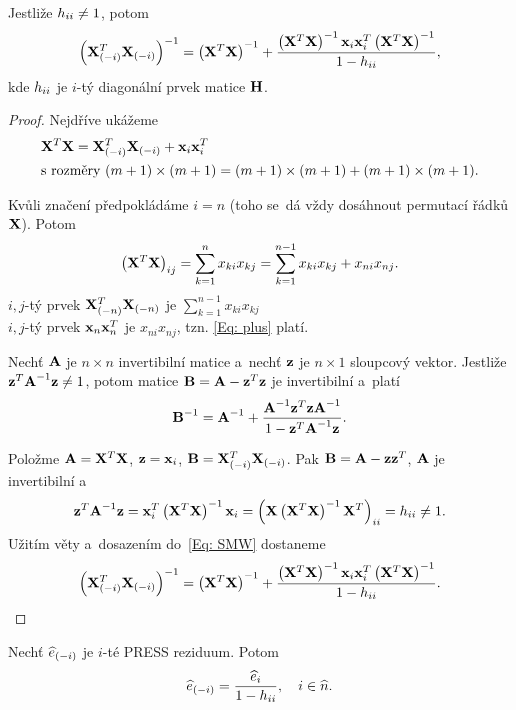 \begin{theorem}
\label{Th: Rozklad_xtx}
Jestliže $h_{ii} \neq 1$, potom
 $$
\left(\mathbf{X}_{(-i)}^T \mathbf{X}_{(-i)} \right)^{-1} = \left(\mathbf{X}^T \mathbf{X} \right)^{-1} + \frac{\left(\mathbf{X}^T \mathbf{X} \right)^{-1} \mathbf{x}_i \mathbf{x}_i^T \left(\mathbf{X}^T \mathbf{X} \right)^{-1}}{1 - h_{ii}},
 $$
kde $h_{ii}$ je $i$-tý diagonální prvek matice $\textbf{H}$.
\end{theorem}

\begin{proof}
Nejdříve ukážeme
\begin{align}
	& \mathbf{X}^T \mathbf{X} = \mathbf{X}_{(-i)}^T \mathbf{X}_{(-i)} + \mathbf{x}_i \mathbf{x}_i^T \label{Eq: plus} \\
	& \text{s rozměry } (m+1) \times (m+1) = (m+1) \times (m+1) + (m+1) \times (m+1). \notag
\end{align}

\newcommand{\sumkn}{\sum_{k = 1}^n}
\newcommand{\sumknn}{\sum_{k = 1}^{n-1}}

Kvůli značení předpokládáme $i = n$ (toho se~dá vždy dosáhnout permutací řádků $\mathbf{X}$). Potom
 $$
\left(\X^T \X \right)_{ij} = \sumkn x_{ki} x_{kj} = \sumknn x_{ki} x_{kj} + x_{ni} x_{nj}.
 $$
 $i,j$-tý prvek $\mathbf{X}_{(-n)}^T \mathbf{X}_{(-n)}$ je $\sumknn x_{ki} x_{kj}$ \\
 $i,j$-tý prvek $\mathbf{x}_n \mathbf{x}_n^T$ je $x_{ni} x_{nj}$, tzn. \eqref{Eq: plus} platí.

\begin{theorem}
Nechť $\textbf{A}$ je $n \times n$ invertibilní matice a~nechť $\mathbf{z}$ je $n \times 1$ sloupcový vektor. Jestliže $\mathbf{z}^T {\textbf{A}^{-1}} \mathbf{z} \neq 1$, potom matice $\textbf{B} = \textbf{A} - \mathbf{z}^T \mathbf{z}$ je invertibilní a~platí
 \begin{equation}
{\textbf{B}^{-1}} = {\textbf{A}^{-1}} + \frac{{\textbf{A}^{-1}} \mathbf{z}^T \mathbf{z} {\textbf{A}^{-1}}}{1 - \mathbf{z}^T {\textbf{A}^{-1}} \mathbf{z}}.
\label{Eq: SMW}
\end{equation}
\end{theorem}

Položme $\textbf{A} = \mathbf{X}^T \mathbf{X}$, $\mathbf{z} = \mathbf{x}_i$, $\textbf{B} = \mathbf{X}_{(-i)}^T \mathbf{X}_{(-i)}$. Pak $\textbf{B} = \textbf{A} - \mathbf{z} \mathbf{z}^T$, $\textbf{A}$ je invertibilní a
 $$
\mathbf{z}^T {\textbf{A}^{-1}} \mathbf{z} = \mathbf{x}_i^T \left(\mathbf{X}^T \mathbf{X} \right)^{-1} \mathbf{x}_i = \left(\mathbf{X} \left(\mathbf{X}^T \mathbf{X} \right)^{-1} \mathbf{X}^T \right)_{ii} = h_{ii} \neq 1.
 $$
Užitím věty a~dosazením do~\eqref{Eq: SMW} dostaneme
 $$
\left(\mathbf{X}_{(-i)}^T \mathbf{X}_{(-i)} \right)^{-1} = \left(\mathbf{X}^T \mathbf{X} \right)^{-1} + \frac{\left(\mathbf{X}^T \mathbf{X} \right)^{-1} \mathbf{x}_i \mathbf{x}_i^T \left(\mathbf{X}^T \mathbf{X} \right)^{-1}}{1 - h_{ii}}.
 $$

\end{proof}

\begin{theorem}
\label{Th: ei}
	Nechť $\widehat{e}_{(-i)}$ je $i$-té PRESS reziduum. Potom
	 $$
	\widehat{e}_{(-i)} = \frac{\widehat{e}_i}{1 - h_{ii}}, \quad i\in\widehat{n}.
	 $$
\end{theorem}

